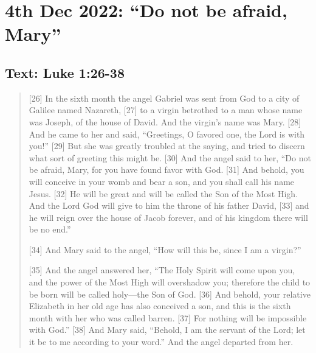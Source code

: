 \section{4th Dec 2022: ``Do not be afraid, Mary''}
\subsection*{Text: Luke 1:26-38}
  \begin{quote}
    [26] In the sixth month the angel Gabriel was sent from God to a city of Galilee named Nazareth, [27] to a virgin betrothed to a man whose name was Joseph, of the house of David. And the virgin’s name was Mary. [28] And he came to her and said, “Greetings, O favored one, the Lord is with you!” [29] But she was greatly troubled at the saying, and tried to discern what sort of greeting this might be. [30] And the angel said to her, “Do not be afraid, Mary, for you have found favor with God. [31] And behold, you will conceive in your womb and bear a son, and you shall call his name Jesus. [32] He will be great and will be called the Son of the Most High. And the Lord God will give to him the throne of his father David, [33] and he will reign over the house of Jacob forever, and of his kingdom there will be no end.”

    [34] And Mary said to the angel, “How will this be, since I am a virgin?”

    [35] And the angel answered her, “The Holy Spirit will come upon you, and the power of the Most High will overshadow you; therefore the child to be born will be called holy—the Son of God. [36] And behold, your relative Elizabeth in her old age has also conceived a son, and this is the sixth month with her who was called barren. [37] For nothing will be impossible with God.” [38] And Mary said, “Behold, I am the servant of the Lord; let it be to me according to your word.” And the angel departed from her.
  \end{quote}
